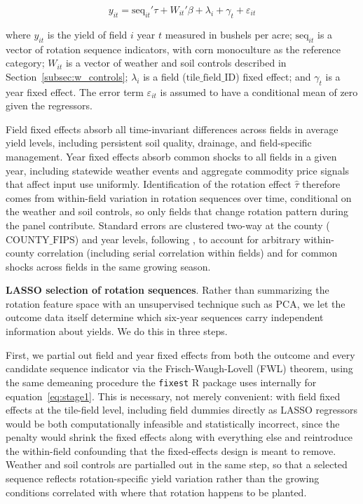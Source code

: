 \documentclass[12pt,letterpaper]{article}
\theoremstyle{remark}
\theoremstyle{remark}
\theoremstyle{plain}
\theoremstyle{definition}
\begin{document}
\begin{equation}
    y_{it}=\text{seq}_{it}'\tau+ W_{it}'\beta+\lambda_{i}+\gamma_{t}+\varepsilon_{it}\label{eq:stage1}
\end{equation}

where $y_{it}$ is the yield of field $i$ year $t$ measured in bushels per acre; $\text{seq}_{it}$ is a vector of rotation sequence indicators, with corn monoculture as the reference category; $W_{it}$ is a vector of weather and soil controls described in Section~\ref{subsec:w_controls}; $\lambda_{i}$ is a field ($\text{tile\_field\_ID}$) fixed effect; and $\gamma_{t}$ is a year fixed effect. The error term $\varepsilon_{it}$ is assumed to
have a conditional mean of zero given the regressors.

Field fixed effects absorb all time-invariant differences across fields in average yield levels, including persistent soil quality, drainage, and field-specific management. Year fixed effects absorb common shocks to all fields in a given year, including statewide weather events and aggregate commodity price signals that affect input use uniformly. Identification of the rotation effect $\hat{\tau}$ therefore comes from within-field variation in rotation sequences over time, conditional on the weather and soil controls, so only fields that change rotation pattern during the panel contribute. Standard errors are clustered two-way at the county ($\text{COUNTY\_FIPS}$) and year levels, following \cite{Cameron2015}, to account for arbitrary within-county correlation (including serial correlation within fields) and for common shocks across fields in the same growing season.

\medskip\noindent\textbf{LASSO selection of rotation sequences}. Rather than summarizing the rotation feature space with an unsupervised technique such as PCA, we let the outcome data itself determine which six-year sequences carry independent information about yields. We do this in three steps.

First, we partial out field and year fixed effects from both the outcome and every candidate sequence indicator via the Frisch-Waugh-Lovell (FWL) theorem, using the same demeaning procedure the \texttt{fixest} R package uses internally for equation~\eqref{eq:stage1}. This is necessary, not merely convenient: with field fixed effects at the tile-field level, including field dummies directly as LASSO regressors would be both computationally infeasible and statistically incorrect, since the penalty would shrink the fixed effects along with everything else and reintroduce the within-field confounding that the fixed-effects design is meant to remove. Weather and soil controls are partialled out in the same step, so that a selected sequence reflects rotation-specific yield variation rather than the growing conditions correlated with where that rotation happens to be planted.
\end{document}
